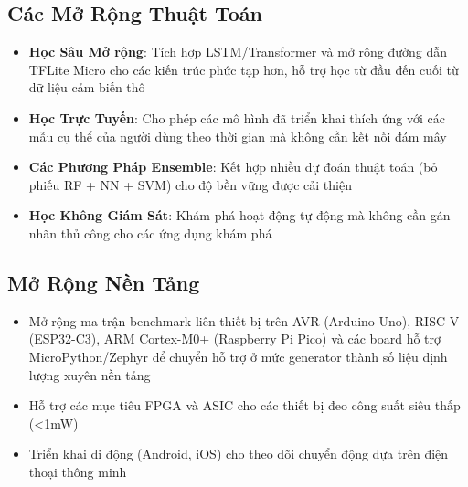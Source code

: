 \subsection{Các Mở Rộng Thuật Toán}
\begin{itemize}
    \item \textbf{Học Sâu Mở rộng}: Tích hợp LSTM/Transformer và mở rộng đường dẫn TFLite Micro cho các kiến trúc phức tạp hơn, hỗ trợ học từ đầu đến cuối từ dữ liệu cảm biến thô
    \item \textbf{Học Trực Tuyến}: Cho phép các mô hình đã triển khai thích ứng với các mẫu cụ thể của người dùng theo thời gian mà không cần kết nối đám mây
    \item \textbf{Các Phương Pháp Ensemble}: Kết hợp nhiều dự đoán thuật toán (bỏ phiếu RF + NN + SVM) cho độ bền vững được cải thiện
    \item \textbf{Học Không Giám Sát}: Khám phá hoạt động tự động mà không cần gán nhãn thủ công cho các ứng dụng khám phá
\end{itemize}

\subsection{Mở Rộng Nền Tảng}
\begin{itemize}
    \item Mở rộng ma trận benchmark liên thiết bị trên AVR (Arduino Uno), RISC-V (ESP32-C3), ARM Cortex-M0+ (Raspberry Pi Pico) và các board hỗ trợ MicroPython/Zephyr để chuyển hỗ trợ ở mức generator thành số liệu định lượng xuyên nền tảng
    \item Hỗ trợ các mục tiêu FPGA và ASIC cho các thiết bị đeo công suất siêu thấp (<1mW)
    \item Triển khai di động (Android, iOS) cho theo dõi chuyển động dựa trên điện thoại thông minh
\end{itemize}

